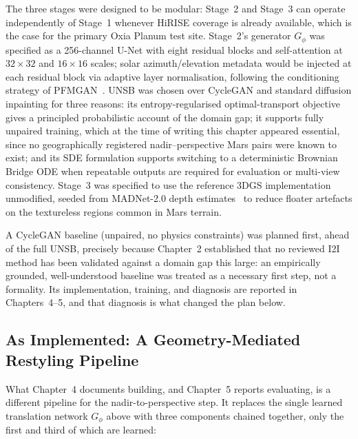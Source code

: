 The three stages were designed to be modular: Stage~2 and Stage~3 can operate independently of Stage~1 whenever HiRISE coverage is already available, which is the case for the primary Oxia Planum test site. Stage~2's generator $G_\phi$ was specified as a 256-channel U-Net with eight residual blocks and self-attention at $32{\times}32$ and $16{\times}16$ scales; solar azimuth/elevation metadata would be injected at each residual block via adaptive layer normalisation, following the conditioning strategy of PFMGAN~\cite{zou2026pfmgan}. UNSB was chosen over CycleGAN and standard diffusion inpainting for three reasons: its entropy-regularised optimal-transport objective gives a principled probabilistic account of the domain gap; it supports fully unpaired training, which at the time of writing this chapter appeared essential, since no geographically registered nadir--perspective Mars pairs were known to exist; and its SDE formulation supports switching to a deterministic Brownian Bridge ODE when repeatable outputs are required for evaluation or multi-view consistency. Stage~3 was specified to use the reference 3DGS implementation~\cite{kerbl2023gaussian} unmodified, seeded from MADNet-2.0 depth estimates~\cite{tao2021madnet} to reduce floater artefacts on the textureless regions common in Mars terrain.

A CycleGAN baseline (unpaired, no physics constraints) was planned first, ahead of the full UNSB, precisely because Chapter~2 established that no reviewed I2I method has been validated against a domain gap this large: an empirically grounded, well-understood baseline was treated as a necessary first step, not a formality. Its implementation, training, and diagnosis are reported in Chapters~4--5, and that diagnosis is what changed the plan below.

\subsection{As Implemented: A Geometry-Mediated Restyling Pipeline}
\label{sec:architecture-implemented}

What Chapter~4 documents building, and Chapter~5 reports evaluating, is a different pipeline for the nadir-to-perspective step. It replaces the single learned translation network $G_\phi$ above with three components chained together, only the first and third of which are learned:

